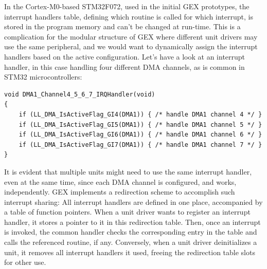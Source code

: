In the Cortex-M0-based STM32F072, used in the initial GEX prototypes, the interrupt handlers table, defining which routine is called for which interrupt, is stored in the program memory and can't be changed at run-time. This is a complication for the modular structure of GEX where different unit drivers may use the same peripheral, and we would want to dynamically assign the interrupt handlers based on the active configuration. Let's have a look at an interrupt handler, in this case handling four different DMA channels, as is common in STM32 microcontrollers:

\begin{verbatim}
void DMA1_Channel4_5_6_7_IRQHandler(void)
{
    if (LL_DMA_IsActiveFlag_GI4(DMA1)) { /* handle DMA1 channel 4 */ }
    if (LL_DMA_IsActiveFlag_GI5(DMA1)) { /* handle DMA1 channel 5 */ }
    if (LL_DMA_IsActiveFlag_GI6(DMA1)) { /* handle DMA1 channel 6 */ }
    if (LL_DMA_IsActiveFlag_GI7(DMA1)) { /* handle DMA1 channel 7 */ }
}
\end{verbatim}

It is evident that multiple units might need to use the same interrupt handler, even at the same time, since each DMA channel is configured, and works, independently. GEX implements a redirection scheme to accomplish such interrupt sharing: All interrupt handlers are defined in one place, accompanied by a table of function pointers. When a unit driver wants to register an interrupt handler, it stores a pointer to it in this redirection table. Then, once an interrupt is invoked, the common handler checks the corresponding entry in the table and calls the referenced routine, if any. Conversely, when a unit driver deinitializes a unit, it removes all interrupt handlers it used, freeing the redirection table slots for other use.











